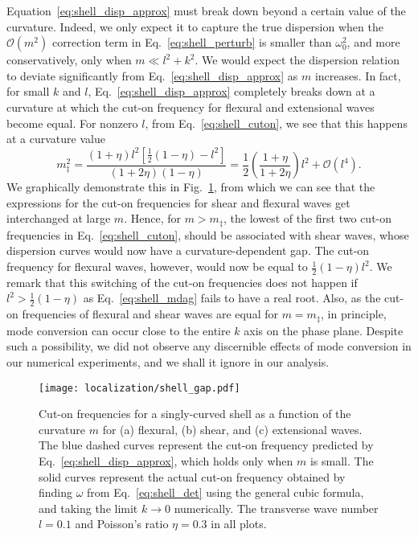 Equation~\eqref{eq:shell_disp_approx} must break down beyond a certain value of the curvature.
Indeed, we only expect it to capture the true dispersion when the $\mathcal{O}(m^{2})$ correction term in Eq.~\eqref{eq:shell_perturb} is smaller than $\omega_{0}^{2}$, and more conservatively, only when $m \ll l^{2} + k^{2}$.
We would expect the dispersion relation to deviate significantly from Eq.~\eqref{eq:shell_disp_approx} as $m$ increases.
In fact, for small $k$ and $l$, Eq.~\eqref{eq:shell_disp_approx} completely breaks down at a curvature at which the cut-on frequency for flexural and extensional waves become equal.
For nonzero $l$, from Eq.~\eqref{eq:shell_cuton}, we see that this happens at a curvature value
%
\begin{equation}
  m_{\ddag}^{2} = \frac{(1 + \eta)l^{2}\left[\frac{1}{2}(1 - \eta) - l^{2}\right]}{\left(1 + 2\eta\right)\left(1 - \eta\right)}
  = \frac{1}{2}\left(\frac{1+\eta}{1 + 2\eta}\right)l^{2} + \mathcal{O}(l^{4}).
  \label{eq:shell_mdag}
\end{equation}
%
We graphically demonstrate this in Fig.~\ref{fig:shell_gap}, from which we can see that the expressions for the cut-on frequencies for shear and flexural waves get interchanged at large $m$.
Hence, for $m > m_{\ddag}$, the lowest of the first two cut-on frequencies in Eq.~\eqref{eq:shell_cuton}, should be associated with shear waves, whose dispersion curves would now have a curvature-dependent gap.
The cut-on frequency for flexural waves, however, would now be equal to $\frac{1}{2}(1-\eta)l^{2}$.
We remark that this switching of the cut-on frequencies does not happen if $l^{2} > \frac{1}{2}(1-\eta)$ as Eq.~\eqref{eq:shell_mdag} fails to have a real root.
Also, as the cut-on frequencies of flexural and shear waves are equal for $m = m_{\ddag}$, in principle, mode conversion can occur close to the entire $k$ axis on the phase plane.
Despite such a possibility, we did not observe any discernible effects of mode conversion in our numerical experiments, and we shall it ignore in our analysis.
%
\begin{figure}
  \begin{center}
    \texttt{[image: localization/shell\_gap.pdf]}
  \end{center}
  \caption{%
    Cut-on frequencies for a singly-curved shell as a function of the curvature $m$ for (a) flexural, (b) shear, and (c) extensional waves.
    The blue dashed curves represent the cut-on frequency predicted by Eq.~\eqref{eq:shell_disp_approx}, which holds only when $m$ is small.
    The solid curves represent the actual cut-on frequency obtained by finding $\omega$ from Eq.~\eqref{eq:shell_det} using the general cubic formula, and taking the limit $k \to 0$ numerically.
    The transverse wave number $l = 0.1$ and Poisson's ratio $\eta = 0.3$ in all plots.
  }
  \label{fig:shell_gap}
\end{figure}

